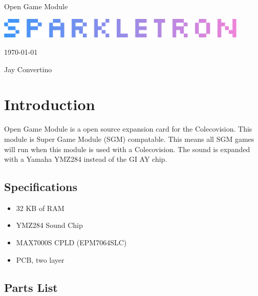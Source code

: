 \begin{titlepage}
  \begin{center}

  {\Huge Open Game Module}

  \vspace{25mm}

  \includegraphics[width=0.90\textwidth,height=\textheight,keepaspectratio]{img/SPARKLETRON.png}

  \vspace{25mm}

  \today

  \vspace{15mm}

  {\Large Jay Convertino}

  \end{center}
\end{titlepage}

\tableofcontents

\newpage

\section{Introduction}

\par
Open Game Module is a open source expansion card for the Colecovision. This module is Super Game Module (SGM) compatable.
This means all SGM games will run when this module is used with a Colecovision. The sound is expanded with a Yamaha YMZ284
instead of the GI AY chip.

\subsection{Specifications}

\par
\begin{itemize}
  \item 32 KB of RAM
  \item YMZ284 Sound Chip
  \item MAX7000S CPLD (EPM7064SLC)
  \item PCB, two layer
\end{itemize}

\subsection{Parts List}

